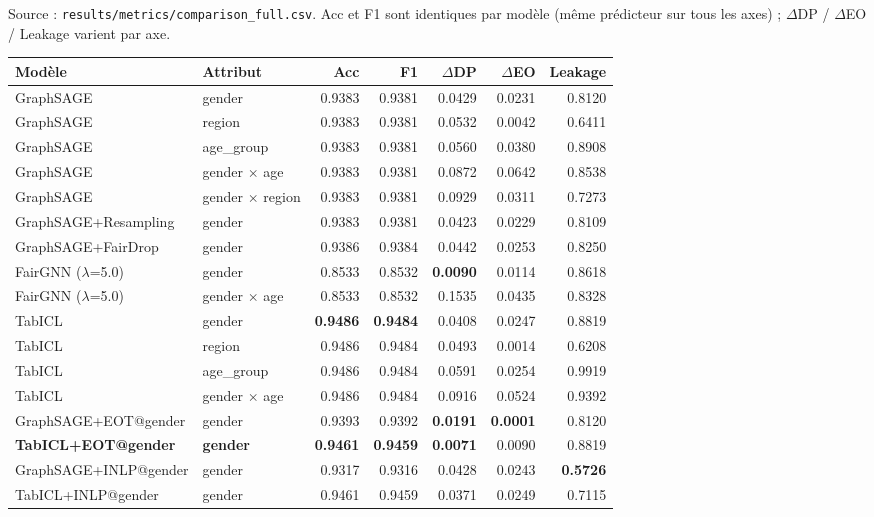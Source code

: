 \documentclass[10pt,a4paper]{article}
\begin{document}
Source : \texttt{results/metrics/comparison\_full.csv}. Acc et F1 sont
identiques par modèle (même prédicteur sur tous les axes) ;
$\Delta$DP / $\Delta$EO / Leakage varient par axe.

\begin{center}\footnotesize
\begin{tabular}{l l r r r r r}
\toprule
\textbf{Modèle} & \textbf{Attribut} & \textbf{Acc} & \textbf{F1} & \textbf{$\Delta$DP} & \textbf{$\Delta$EO} & \textbf{Leakage} \\
\midrule
GraphSAGE & gender & 0.9383 & 0.9381 & 0.0429 & 0.0231 & 0.8120 \\
GraphSAGE & region & 0.9383 & 0.9381 & 0.0532 & 0.0042 & 0.6411 \\
GraphSAGE & age\_group & 0.9383 & 0.9381 & 0.0560 & 0.0380 & 0.8908 \\
GraphSAGE & gender $\times$ age & 0.9383 & 0.9381 & 0.0872 & 0.0642 & 0.8538 \\
GraphSAGE & gender $\times$ region & 0.9383 & 0.9381 & 0.0929 & 0.0311 & 0.7273 \\
GraphSAGE+Resampling & gender & 0.9383 & 0.9381 & 0.0423 & 0.0229 & 0.8109 \\
GraphSAGE+FairDrop & gender & 0.9386 & 0.9384 & 0.0442 & 0.0253 & 0.8250 \\
FairGNN ($\lambda$=5.0) & gender & 0.8533 & 0.8532 & \textbf{0.0090} & 0.0114 & 0.8618 \\
FairGNN ($\lambda$=5.0) & gender $\times$ age & 0.8533 & 0.8532 & 0.1535 & 0.0435 & 0.8328 \\
TabICL & gender & \textbf{0.9486} & \textbf{0.9484} & 0.0408 & 0.0247 & 0.8819 \\
TabICL & region & 0.9486 & 0.9484 & 0.0493 & 0.0014 & 0.6208 \\
TabICL & age\_group & 0.9486 & 0.9484 & 0.0591 & 0.0254 & 0.9919 \\
TabICL & gender $\times$ age & 0.9486 & 0.9484 & 0.0916 & 0.0524 & 0.9392 \\
GraphSAGE+EOT@gender & gender & 0.9393 & 0.9392 & \textbf{0.0191} & \textbf{0.0001} & 0.8120 \\
\textbf{TabICL+EOT@gender} & \textbf{gender} & \textbf{0.9461} & \textbf{0.9459} & \textbf{0.0071} & 0.0090 & 0.8819 \\
GraphSAGE+INLP@gender & gender & 0.9317 & 0.9316 & 0.0428 & 0.0243 & \textbf{0.5726} \\
TabICL+INLP@gender & gender & 0.9461 & 0.9459 & 0.0371 & 0.0249 & 0.7115 \\

\end{tabular}
\end{center}
\end{document}
